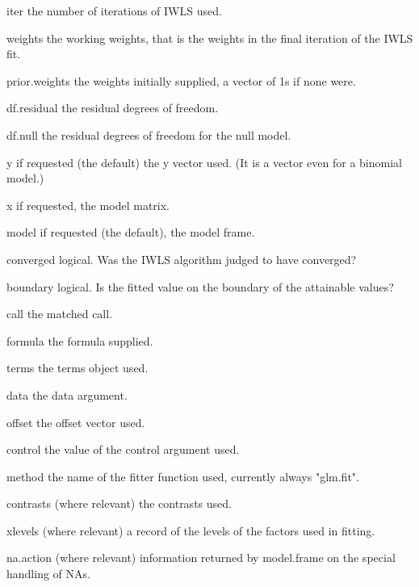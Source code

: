 iter the number of iterations of IWLS used.
 
weights the working weights, that is the weights in the final iteration of the IWLS fit.
 
prior.weights the weights initially supplied, a vector of 1s if none were.
 
df.residual the residual degrees of freedom.
 
df.null the residual degrees of freedom for the null model.
 
y if requested (the default) the y vector used. (It is a vector even for a binomial model.)
 
x if requested, the model matrix.
 
model if requested (the default), the model frame.
 
converged logical. Was the IWLS algorithm judged to have converged?
 
boundary logical. Is the fitted value on the boundary of the attainable values?
 
call the matched call.
 
formula the formula supplied.
 
terms the terms object used.
 
data the data argument.
 
offset the offset vector used.
 
control the value of the control argument used.
 
method the name of the fitter function used, currently always "glm.fit".
 
contrasts (where relevant) the contrasts used.
 
xlevels (where relevant) a record of the levels of the factors used in fitting.
 
na.action (where relevant) information returned by model.frame on the special handling of NAs.
 
